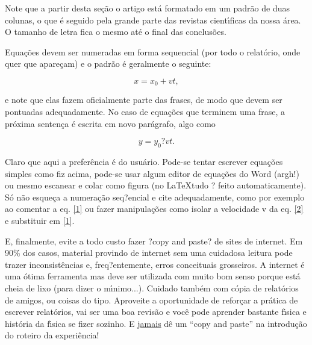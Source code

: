 \documentclass[twocolumn]{article}
\newcommand{\2}{\hspace{5mm}}
\newcommand{\5}{\vspace{5mm}}
\newcommand{\7}{\vspace{7mm}}
\begin{document}
\2 Note que a partir desta se\c{c}\~ao o artigo est\'a formatado em um 
padr\~ao de duas colunas, o que \'e seguido pela grande parte das 
revistas cient\'{\i}ficas da nossa \'area. O tamanho de letra fica o 
mesmo at\'e o final das conclus\~oes.

\2 Equa\c{c}\~oes devem ser numeradas em forma sequencial (por todo o 
relat\'orio, onde quer que apare\c{c}am) e o padr\~ao \'e geralmente o 
seguinte:

\begin{equation}
x = x_{0} + v t,
\label{1}
\end{equation}

e note que elas fazem oficialmente parte das frases, de modo que devem 
ser pontuadas adequadamente. No caso de equa\c{c}\~oes que terminem uma 
frase, a pr\'oxima senten\c{c}a \'e escrita em novo par\'agrafo, algo 
como

\begin{equation}
y = y_{0} ? v t.
\label{2}
\end{equation}

\2 Claro que aqui a prefer\^encia \'e do usu\'ario. Pode-se tentar 
escrever equa\c{c}\~oes simples como fiz acima, pode-se usar algum 
editor de equa\c{c}\~oes do Word (argh!) ou mesmo escanear e colar 
como figura (no \LaTeX tudo ? feito automaticamente). S\'o n\~ao 
esque\c{c}a a numera\c{c}\~ao seq?encial e cite adequadamente, como 
por exemplo ao comentar a eq. \ref{1} ou fazer manipula\c{c}\~oes 
como isolar a velocidade v da eq. \ref{2} e substituir em \ref{1}.

\newpage
\vspace*{8.1cm}

\2 E, finalmente, evite a todo custo fazer ?copy and paste? de sites 
de internet. Em 90\% dos casos, material provindo de internet sem uma 
cuidadosa leitura pode trazer inconsist\^encias e, freq?entemente, 
erros conceituais grosseiros. A internet \'e uma \'otima ferramenta 
mas deve ser utilizada com muito bom senso porque est\'a cheia de lixo 
(para dizer o m\'{\i}nimo...). Cuidado tamb\'em com c\'opia de 
relat\'orios de amigos, ou coisas do tipo. Aproveite a oportunidade 
de refor\c{c}ar a pr\'atica de escrever relat\'orios, vai ser uma boa 
revis\~ao e voc\^e pode aprender bastante f\'{\i}sica e hist\'oria da 
f\'{\i}sica se fizer sozinho. E \underline{jamais} d\^e um ``copy and 
paste'' na introdu\c{c}\~ao do roteiro da experi\^encia!
\end{document}
